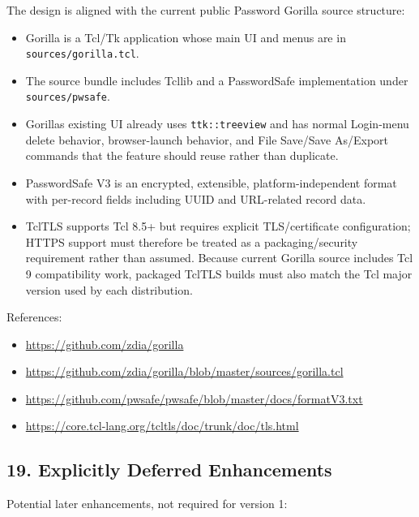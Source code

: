 \documentclass[
  letterpaper,
]{article}
\providecommand{\tightlist}{%
  \setlength{\itemsep}{0pt}\setlength{\parskip}{0pt}}
\begin{document}
The design is aligned with the current public Password Gorilla source structure:

\begin{itemize}
\tightlist
\item
  Gorilla is a Tcl/Tk application whose main UI and menus are in \nolinkurl{sources/gorilla.tcl}.
\item
  The source bundle includes Tcllib and a PasswordSafe implementation under \nolinkurl{sources/pwsafe}.
\item
  Gorilla\textquotesingle s existing UI already uses \nolinkurl{ttk::treeview} and has normal Login-menu delete
  behavior, browser-launch behavior, and File Save/Save As/Export commands that the feature should reuse rather than
  duplicate.
\item
  PasswordSafe V3 is an encrypted, extensible, platform-independent format with per-record fields including UUID and
  URL-related record data.
\item
  TclTLS supports Tcl 8.5+ but requires explicit TLS/certificate configuration; HTTPS support must therefore be treated
  as a packaging/security requirement rather than assumed. Because current Gorilla source includes Tcl 9 compatibility
  work, packaged TclTLS builds must also match the Tcl major version used by each distribution.
\end{itemize}

References:

\begin{itemize}
\tightlist
\item
  \url{https://github.com/zdia/gorilla}
\item
  \url{https://github.com/zdia/gorilla/blob/master/sources/gorilla.tcl}
\item
  \url{https://github.com/pwsafe/pwsafe/blob/master/docs/formatV3.txt}
\item
  \url{https://core.tcl-lang.org/tcltls/doc/trunk/doc/tls.html}
\end{itemize}

\subsection{19. Explicitly Deferred Enhancements}\label{19-explicitly-deferred-enhancements}

Potential later enhancements, not required for version 1:
\end{document}
